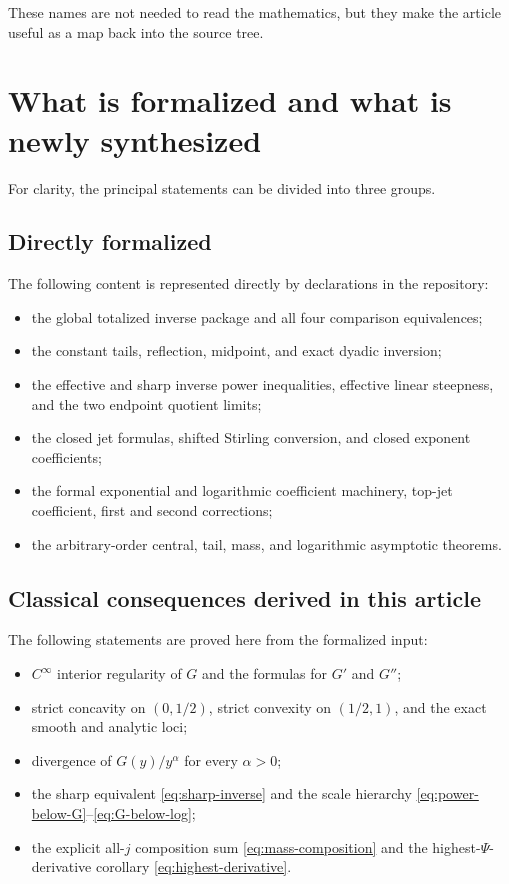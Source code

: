 \documentclass[11pt,oneside]{article}
\theoremstyle{definition}
\theoremstyle{remark}
\newcommand{\InvF}{G}
\begin{document}
These names are not needed to read the mathematics, but they make the
article useful as a map back into the source tree.

\section{What is formalized and what is newly synthesized}
\label{sec:status-ledger}

For clarity, the principal statements can be divided into three groups.

\subsection{Directly formalized}

The following content is represented directly by declarations in the
repository:
\begin{itemize}
\item the global totalized inverse package and all four comparison
equivalences;
\item the constant tails, reflection, midpoint, and exact dyadic
inversion;
\item the effective and sharp inverse power inequalities, effective
linear steepness, and the two endpoint quotient limits;
\item the closed jet formulas, shifted Stirling conversion, and closed
exponent coefficients;
\item the formal exponential and logarithmic coefficient machinery,
top-jet coefficient, first and second corrections;
\item the arbitrary-order central, tail, mass, and logarithmic
asymptotic theorems.
\end{itemize}

\subsection{Classical consequences derived in this article}

The following statements are proved here from the formalized input:
\begin{itemize}
\item $C^\infty$ interior regularity of $\InvF$ and the formulas for
$\InvF'$ and $\InvF''$;
\item strict concavity on $(0,1/2)$, strict convexity on $(1/2,1)$,
and the exact smooth and analytic loci;
\item divergence of $\InvF(y)/y^\alpha$ for every $\alpha>0$;
\item the sharp equivalent \eqref{eq:sharp-inverse} and the scale
hierarchy \eqref{eq:power-below-G}--\eqref{eq:G-below-log};
\item the explicit all-$j$ composition sum \eqref{eq:mass-composition}
and the highest-$\Psi$-derivative corollary
\eqref{eq:highest-derivative}.
\end{itemize}
\end{document}
